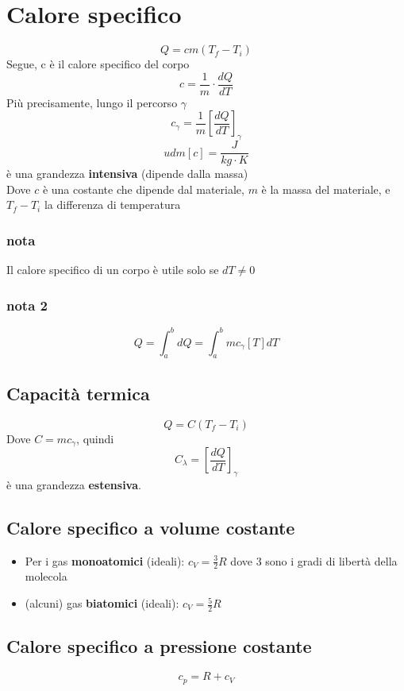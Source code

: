 \documentclass[a4paper]{report}
\begin{document}
  \section{Calore specifico}
  $$ Q = cm(T_f - T_i) $$
  Segue, c è il calore specifico del corpo
  $$ c = \frac{1}{m} \cdot \frac{dQ}{dT} $$
  Più precisamente, lungo il percorso $\gamma$
  $$ c_\gamma = \frac{1}{m} [\frac{dQ}{dT}]_\gamma $$
  $$ udm[c] = \frac{J}{kg\cdot K} $$
  è una grandezza \textbf{intensiva} (dipende dalla massa)\\
  Dove $c$ è una costante che dipende dal materiale, $m$ è la massa del materiale, e $T_f - T_i$ la differenza di temperatura
  \subsubsection{nota}
  Il calore specifico di un corpo è utile solo se $dT \neq 0$
  \subsubsection{nota 2}
  $$ Q = \int_{a}^b dQ = \int_a^b m c_\gamma[T] dT $$
  \subsection{Capacità termica}
  $$ Q = C(T_f-T_i) $$
  Dove $C = mc_\gamma$, quindi
  $$ C_\lambda = [\frac{dQ}{dT}]_\gamma $$
  è una grandezza \textbf{estensiva}.
  \subsection{Calore specifico a volume costante}
  \begin{itemize}
    \item Per i gas \textbf{monoatomici} (ideali):  $c_V = \frac{3}{2}R$ dove $3$ sono i gradi di libertà della molecola
    \item (alcuni) gas \textbf{biatomici} (ideali):  $c_V = \frac{5}{2}R$
  \end{itemize}
  \subsection{Calore specifico a pressione costante}
  $$ c_p = R + c_V $$
\end{document}

